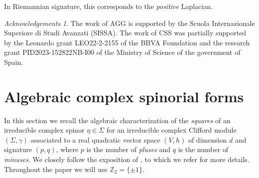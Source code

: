 \documentclass[10pt,a4paper,twoside,reqno]{amsart}
\theoremstyle{plain}
\theoremstyle{definition}
\theoremstyle{remark}
\newtheorem*{ack}{Acknowledgements}
\def\Z{\mathbb{Z}}
\begin{document}
\noindent
In Riemannian signature, this corresponds to the \emph{positive} Laplacian.

\begin{ack}
The work of AGG is supported by the Scuola Internazionale Superiore di Studi Avanzati (SISSA). The work of CSS was partially supported by the Leonardo grant LEO22-2-2155 of the BBVA Foundation and the research grant PID2023-152822NB-I00 of the Ministry of Science of the government of Spain. 
\end{ack}

\begin{center}
\end{center}


\section{Algebraic complex spinorial forms}
\label{sec:spinorialforms}


In this section we recall the algebraic characterization of the \emph{squares} of an irreducible complex spinor $\eta\in\Sigma$ for an irreducible complex Clifford module $(\Sigma,\gamma)$ associated to a real quadratic vector space $(V,h)$ of dimension $d$ and signature $(p,q)$, where $p$ is the number of \emph{pluses} and $q$ is the number of \emph{minuses}. We closely follow the exposition of \cite{Algebraic_Complex_Square_2025}, to which we refer for more details. Throughout the paper we will use $\Z_2=\{\pm1\}$.\medskip
\end{document}
